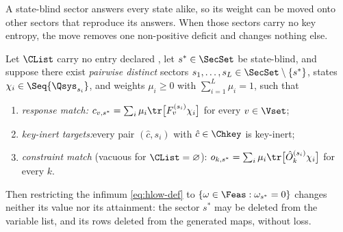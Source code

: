 
A state-blind sector answers every state alike, so its weight can be moved
onto other sectors that reproduce its answers. When those sectors carry no
key entropy, the move removes one non-positive deficit and changes nothing
else.

\begin{theorem}\label{thm:removal}
Let $\CList$ carry no entry declared , let
$s^{*}\in\SecSet$ be state-blind, and suppose there exist
\emph{pairwise distinct} sectors
$s_1,\dots,s_L\in\SecSet\setminus\{s^{*}\}$, states
$\chi_i\in\Seq{\Qsys_{s_i}}$, and weights $\mu_i\ge0$ with
$\sum_{i=1}^{L}\mu_i=1$, such that
\begin{enumerate}[label=(RM\arabic*),leftmargin=3.0em]
\item \emph{response match:}\quad
$c_{v,s^{*}}=\sum_{i}\mu_i\tr\big[F^{(s_i)}_v\chi_i\big]$ for every
$v\in\Vset$;
\item \emph{key-inert targets:}\quad every pair $(\hat c,s_i)$ with
$\hat c\in\Chkey$ is key-inert;
\item \emph{constraint match} (vacuous for $\CList=\varnothing$):\quad
$o_{k,s^{*}}=\sum_i\mu_i\tr\big[\hat O^{(s_i)}_k\chi_i\big]$ for every
$k$.
\end{enumerate}
Then restricting the infimum \eqref{eq:hlow-def} to
$\{\omega\in\Feas:\omega_{s^{*}}=0\}$ changes neither its value nor its
attainment: the sector $s^{*}$ may be deleted from the variable list, and
its rows deleted from the generated maps, without loss.
\end{theorem}

